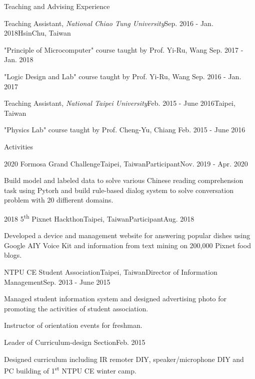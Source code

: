 \documentclass{resume} %
\newcommand{\ts}{\textsuperscript}
\begin{document}
\begin{rSection}{Teaching and Advising Experience}
    \begin{rSubsection}{Teaching Assistant, \it{National Chiao Tung University}}{Sep. 2016 - Jan. 2018}{}{HsinChu, Taiwan}
        \item "Principle of Microcomputer" course taught by Prof. Yi-Ru, Wang \hfill Sep. 2017 - Jan. 2018
        \item "Logic Design and Lab" course taught by Prof. Yi-Ru, Wang \hfill Sep. 2016 - Jan. 2017
    \end{rSubsection}
    \begin{rSubsection}{Teaching Assistant, \it{National Taipei University}}{Feb. 2015 - June 2016}{}{Taipei, Taiwan}
        \item "Physics Lab" course taught by Prof. Cheng-Yu, Chiang \hfill Feb. 2015 - June 2016
    \end{rSubsection}
\end{rSection}

\begin{rSection}{Activities}
    \begin{rSubsection}{2020 Formosa Grand Challenge}{Taipei, Taiwan}{Participant}{Nov. 2019 - Apr. 2020}
        \item Build model and labeled data to solve various Chinese reading comprehension task using Pytorh 
        and build rule-based dialog system to solve conversation problem with 20 diffierent domains.
    \end{rSubsection}
    \begin{rSubsection}{2018 5\ts{th} Pixnet Hackthon}{Taipei, Taiwan}{Participant}{Aug. 2018}
        \item Developed a device and management website for answering popular dishes using Google AIY Voice Kit and information from text mining on 200,000 Pixnet food blogs.
    \end{rSubsection}
    \begin{rSubsection}{NTPU CE Student Association}{Taipei, Taiwan}{Director of Information Management}{Sep. 2013 - June 2015}
        \item Managed student information system and designed advertising photo for promoting the activities of student association.
        \item Instructor of orientation events for freshman.
    \end{rSubsection}
    \begin{rSubsection2}{Leader of Curriculum-design Section}{Feb. 2015}
        \item Designed curriculum including IR remoter DIY, speaker/microphone DIY and PC building of 1\ts{st} NTPU CE winter camp.
    \end{rSubsection2}
\end{rSection}
\end{document}
